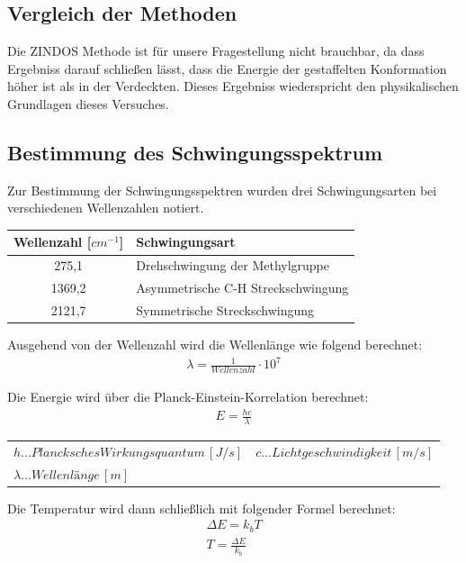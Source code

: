 \subsection{Vergleich der Methoden}

Die ZINDOS Methode ist für unsere Fragestellung nicht brauchbar, da dass Ergebniss darauf schließen lässt, dass die Energie der gestaffelten Konformation
höher ist als in der Verdeckten. Dieses Ergebniss wiederspricht den physikalischen Grundlagen dieses Versuches. 

\subsection{Bestimmung des Schwingungsspektrum}
Zur Bestimmung der Schwingungsspektren wurden drei Schwingungsarten bei verschiedenen Wellenzahlen notiert.

\begin{table}[H]
    \centering
    \begin{tabular}{cl}
        \toprule 
        Wellenzahl [$cm^{-1}$] & Schwingungsart \\
        \midrule
        275,1	& Drehschwingung der Methylgruppe \\
        1369,2	& Asymmetrische C-H Streckschwingung \\
        2121,7	& Symmetrische Streckschwingung  \\
        \bottomrule
    \end{tabular}
\end{table}
Ausgehend von der Wellenzahl wird die Wellenlänge wie folgend berechnet:
\begin{align}
    \lambda = \frac{1}{Wellenzahl} \cdot 10^7
\end{align}

Die Energie wird über die Planck-Einstein-Korrelation berechnet:
\begin{align}
    E = \frac{hc}{\lambda}
\end{align}

\begin{table}[H]
    \centering
    \begin{tabular}{ll}
        $h...Plancksches Wirkungsquantum \, [J/s]$ & $c...Lichtgeschwindigkeit \, [m/s]$ \\
        $\lambda...Wellenlänge \, [m]$ &  \\
    \end{tabular}
\end{table}
Die Temperatur wird dann schließlich mit folgender Formel berechnet:
\begin{align*}
    \Delta E = k_b T \\
    T = \frac{\Delta E}{k_b}
\end{align*}


